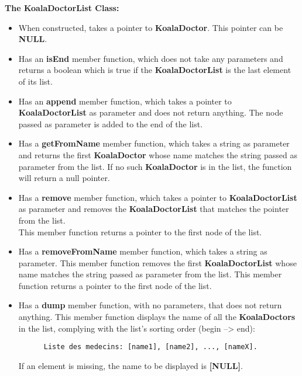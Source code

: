 \textbf{The KoalaDoctorList Class:}
\begin{itemize}
  \item When constructed, takes a pointer to \textbf{KoalaDoctor}. This pointer
    can be \textbf{NULL}.

  \item Has an \textbf{isEnd} member function, which does not take any parameters
    and returns a boolean which is true if the \textbf{KoalaDoctorList} is the
    last element of its list.

  \item Has an \textbf{append} member function, which takes a pointer to
    \textbf{KoalaDoctorList} as parameter and does not return anything. The node
    passed as parameter is added to the end of the list.

  \item Has a \textbf{getFromName} member function, which takes a string as parameter
    and returns the first \textbf{KoalaDoctor} whose name matches the string passed
    as parameter from the list. If no such \textbf{KoalaDoctor} is in the list, the
    function will return a null pointer.


  \item Has a \textbf{remove} member function, which takes a pointer to
    \textbf{KoalaDoctorList} as parameter and removes the \textbf{KoalaDoctorList}
    that matches the pointer from the list.\\
    This member function returns a pointer to the first node of the list.

  \item Has a \textbf{removeFromName} member function, which takes a string as
    parameter. This member function removes the first \textbf{KoalaDoctorList} whose
    name matches the string passed as parameter from the list. This member function
    returns a pointer to the first node of the list.

  \item Has a \textbf{dump} member function, with no parameters, that does not return
    anything. This member function displays the name of all the \textbf{KoalaDoctors}
    in the list, complying with the list's sorting order (begin --> end):
    \begin{lstlisting}
      Liste des medecins: [name1], [name2], ..., [nameX].
    \end{lstlisting}
    If an element is missing, the name to be displayed is \textbf{[NULL]}.
\end{itemize}

